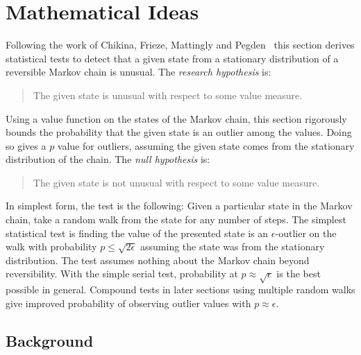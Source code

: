\documentclass[12pt]{article}
\begin{document}
\section*{Mathematical Ideas}

Following the work of Chikina, Frieze, Mattingly and Pegden~%
\cite{doi:10.1080/2330443X.2020.1806763, Chikina2860, Chikina2019} this
section derives statistical tests to detect that a given state from a
stationary distribution of a reversible Markov chain is unusual.  The
\emph{research hypothesis} is:
\begin{quote}
    The given state is unusual with respect to some value measure.
\end{quote}
Using a value function on the states of the Markov chain, this section
rigorously bounds the probability that the given state is an outlier
among the values.  Doing so gives a \( p \) value for outliers, assuming
the given state comes from the stationary distribution of the chain.
The \emph{null hypothesis} is:
\begin{quote}
    The given state is not unusual with respect to some value measure.
\end{quote}

In simplest form, the test is the following:  Given a particular state
in the Markov chain, take a random walk from the state for any number of
steps.  The simplest statistical test is finding the value of the
presented state is an \( \epsilon \)-outlier on the walk with
probability \( p \le \sqrt{2\epsilon} \) assuming the state was from the
stationary distribution.  The test assumes nothing about the Markov
chain beyond reversibility.  With the simple serial test, probability at
\( p \approx \sqrt{\epsilon} \) is the best possible in general.
Compound tests in later sections using multiple random walks give
improved probability of observing outlier values with \( p \approx
\epsilon \).

\subsection*{Background}
\end{document}
